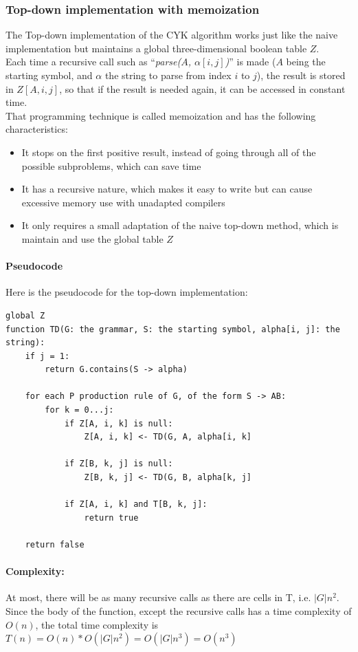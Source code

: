 \documentclass[twocolumn]{article}
\begin{document}
\subsubsection{Top-down implementation with memoization}
The Top-down implementation of the CYK algorithm works just like the naive implementation but maintains a global three-dimensional boolean table $Z$.\\
Each time a recursive call such as ``\textit{parse($A$, $\alpha[i, j]$)}'' is made ($A$ being the starting symbol, and $\alpha$ the string to parse from index $i$ to $j$), the result is stored in $Z[A,i,j]$, so that if the result is needed again, it can be accessed in constant time.\\
That programming technique is called memoization and has the following characteristics:
\begin{itemize}
  \item It stops on the first positive result, instead of going through all of the possible subproblems, which can save time
  \item It has a recursive nature, which makes it easy to write but can cause excessive memory use with unadapted compilers
  \item It only requires a small adaptation of the naive top-down method, which is maintain and use the global table $Z$
\end{itemize}

\paragraph{Pseudocode} Here is the pseudocode for the top-down implementation:
\begin{lstlisting}
global Z
function TD(G: the grammar, S: the starting symbol, alpha[i, j]: the string):
    if j = 1:
        return G.contains(S -> alpha)

    for each P production rule of G, of the form S -> AB:
        for k = 0...j:
            if Z[A, i, k] is null:
                Z[A, i, k] <- TD(G, A, alpha[i, k]

            if Z[B, k, j] is null:
                Z[B, k, j] <- TD(G, B, alpha[k, j]

            if Z[A, i, k] and T[B, k, j]:
                return true

    return false
\end{lstlisting}

\paragraph{Complexity:}
At most, there will be as many recursive calls as there are cells in T, i.e. $|G|n^2$. Since the body of the function, except the recursive calls has a time complexity of $O(n)$, the total time complexity is $T(n)=O(n)*O(|G|n^2)=O(|G|n^3)=O(n^3)$
\end{document}
